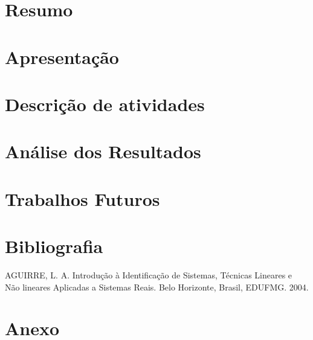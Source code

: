 \documentclass[a4paper,12pt]{article}
\begin{document}
\newpage
{}
\section{Resumo}
\newpage
\section{Apresentação}
\newpage

\section{Descrição de atividades}

\newpage
\section{Análise dos Resultados}
\newpage
\section{Trabalhos Futuros}
\newpage

\section*{Bibliografia}
\footnotesize{

\noindent AGUIRRE, L. A. Introdução à Identificação de Sistemas, Técnicas Lineares e Não lineares Aplicadas a Sistemas Reais. Belo Horizonte, Brasil, EDUFMG. 2004.\\

}
\newpage
{}
\section*{Anexo}
\end{document}
